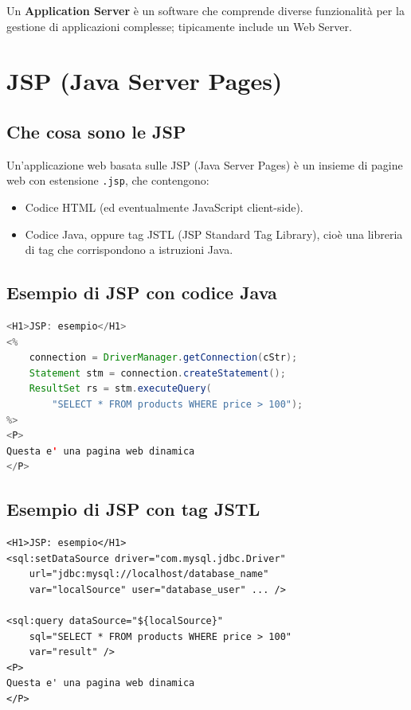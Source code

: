 Un \textbf{Application Server} è un software che comprende diverse funzionalità per la gestione di applicazioni complesse; tipicamente include un Web Server.

\section{JSP (Java Server Pages)}

\subsection{Che cosa sono le JSP}

Un'applicazione web basata sulle JSP (Java Server Pages) è un insieme di pagine web con estensione \texttt{.jsp}, che contengono:

\begin{itemize}
    \item Codice HTML (ed eventualmente JavaScript client-side).
    \item Codice Java, oppure tag JSTL (JSP Standard Tag Library), cioè una libreria di tag che corrispondono a istruzioni Java.
\end{itemize}

\subsection{Esempio di JSP con codice Java}

\begin{lstlisting}[language=Java]
<H1>JSP: esempio</H1>
<%
    connection = DriverManager.getConnection(cStr);
    Statement stm = connection.createStatement();
    ResultSet rs = stm.executeQuery(
        "SELECT * FROM products WHERE price > 100");
%>
<P>
Questa e' una pagina web dinamica
</P>
\end{lstlisting}

\subsection{Esempio di JSP con tag JSTL}

\begin{lstlisting}[language=HTML5]
<H1>JSP: esempio</H1>
<sql:setDataSource driver="com.mysql.jdbc.Driver"
    url="jdbc:mysql://localhost/database_name"
    var="localSource" user="database_user" ... />

<sql:query dataSource="${localSource}"
    sql="SELECT * FROM products WHERE price > 100"
    var="result" />
<P>
Questa e' una pagina web dinamica
</P>
\end{lstlisting}

